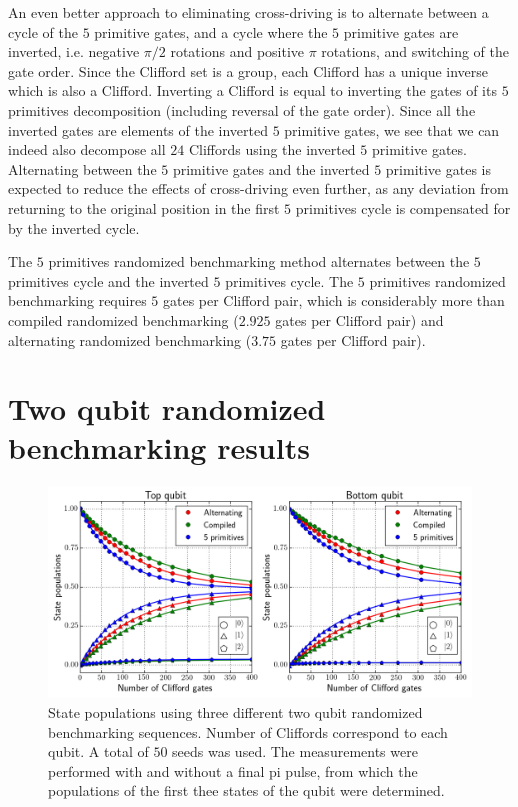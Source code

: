         An even better approach to eliminating cross-driving is to alternate between a cycle of the $5$ primitive gates, and a cycle where the $5$ primitive gates are inverted, i.e. negative $\pi/2$ rotations and positive $\pi$ rotations, and switching of the gate order. Since the Clifford set is a group, each Clifford has a unique inverse which is also a Clifford. Inverting a Clifford is equal to inverting the gates of its $5$ primitives decomposition (including reversal of the gate order). Since all the inverted gates are elements of the inverted $5$ primitive gates, we see that we can indeed also decompose all $24$ Cliffords using the inverted $5$ primitive gates. Alternating between the $5$ primitive gates and the inverted $5$ primitive gates is expected to reduce the effects of cross-driving even further, as any deviation from returning to the original position in the first $5$ primitives cycle is compensated for by the inverted cycle.

        The $5$ primitives randomized benchmarking method alternates between the $5$ primitives cycle and the inverted $5$ primitives cycle. The $5$ primitives randomized benchmarking requires $5$ gates per Clifford pair, which is considerably more than compiled randomized benchmarking ($2.925$ gates per Clifford pair) and alternating randomized benchmarking ($3.75$ gates per Clifford pair).

        \section{Two qubit randomized benchmarking results}
          \label{Two qubit randomized benchmarking results}

          \begin{figure}[tb]
            \centering
            \includegraphics[width=\textwidth]{../Figures/Randomized benchmarking/RB_2Q_state_populations_notable.png}
            \caption{State populations using three different two qubit randomized benchmarking sequences. Number of Cliffords correspond to each qubit. A total of $50$ seeds was used. The measurements were performed with and without a final pi pulse, from which the populations of the first thee states of the qubit were determined.}
            \label{fig:RB 2Q state populations}
          \end{figure}

